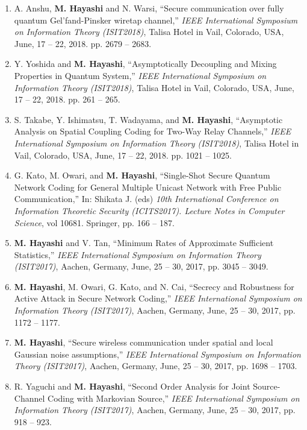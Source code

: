 \documentclass[a4paper,12pt,oneside]{article}
\begin{document}
\begin{enumerate}
\item 
A. Anshu, \textbf{M. Hayashi} and N. Warsi,
``Secure communication over fully quantum Gel'fand-Pinsker wiretap channel,''
{\em IEEE International Symposium on Information Theory (ISIT2018)}, 
 Talisa Hotel in Vail, Colorado, USA, June, 17 -- 22, 2018.
pp. 2679 -- 2683. 

\item 
Y. Yoshida and \textbf{M. Hayashi},
``Asymptotically Decoupling and Mixing Properties in Quantum System,''
{\em IEEE International Symposium on Information Theory (ISIT2018)}, 
 Talisa Hotel in Vail, Colorado, USA, June, 17 -- 22, 2018.
pp. 261 -- 265.
 
\item 
S. Takabe,
Y. Ishimatsu,
T. Wadayama, and \textbf{M. Hayashi},
``Asymptotic Analysis on Spatial Coupling Coding for Two-Way Relay Channels,''
{\em IEEE International Symposium on Information Theory (ISIT2018)}, 
 Talisa Hotel in Vail, Colorado, USA, June, 17 -- 22, 2018.
pp. 1021 -- 1025.


\item 
G. Kato, M. Owari, and \textbf{M. Hayashi},
``Single-Shot Secure Quantum Network Coding
for General Multiple Unicast Network with Free
Public Communication,''
In: Shikata J. (eds) 
{\em 10th International Conference on Information Theoretic Security (ICITS2017). 
Lecture Notes in Computer Science},
 vol 10681. Springer,  pp. 166 -- 187.

\item 
\textbf{M. Hayashi} and V. Tan,
``Minimum Rates of Approximate Sufficient Statistics,''
{\em IEEE International Symposium on Information Theory (ISIT2017)}, 
Aachen, Germany, June, 25 -- 30, 2017, pp. 3045 -- 3049.

\item 
\textbf{M. Hayashi}, M. Owari, G. Kato, and N. Cai,
``Secrecy and Robustness for Active Attack in Secure Network Coding,''
{\em IEEE International Symposium on Information Theory (ISIT2017)}, 
Aachen, Germany, June, 25 -- 30, 2017, pp. 1172 -- 1177.

\item 
\textbf{M. Hayashi},
``Secure wireless communication under spatial and local Gaussian noise assumptions,''
{\em IEEE International Symposium on Information Theory (ISIT2017)}, 
Aachen, Germany, June, 25 -- 30, 2017, pp. 1698 -- 1703.

\item 
R. Yaguchi and \textbf{M. Hayashi},
``Second Order Analysis for Joint Source-Channel Coding with Markovian Source,''
{\em IEEE International Symposium on Information Theory (ISIT2017)}, 
Aachen, Germany, June, 25 -- 30, 2017, pp. 918 -- 923.


\end{enumerate}
\end{document}
